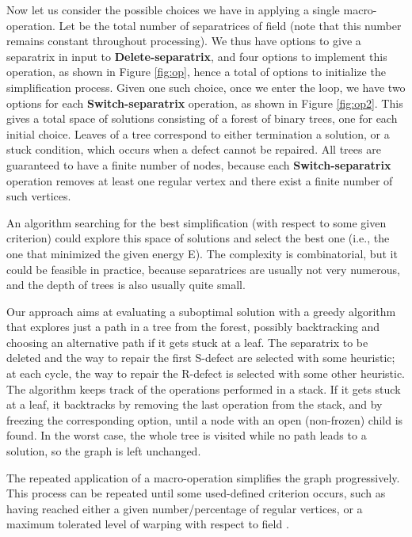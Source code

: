 \documentclass[11pt,a4paper]{article}
\begin{document}
Now let us consider the possible choices we have in applying a single macro-operation. 
Let  be the total number of separatrices of field  (note that this number remains constant throughout processing).
We thus have  options to give a separatrix in input to \textbf{Delete-separatrix}, and four options to implement this operation, as shown in Figure \ref{fig:op}, hence a total of  options to initialize the simplification process.   
Given one such choice, once we enter the loop, we have two options for each \textbf{Switch-separatrix} operation, as shown in Figure \ref{fig:op2}.
This gives a total space of solutions consisting of a forest of  binary trees, one for each initial choice.
Leaves of a tree correspond to either termination a solution, or a stuck condition, which occurs when a defect cannot be repaired.
All trees are guaranteed to have a finite number of nodes, because each \textbf{Switch-separatrix} operation removes at least one regular vertex and there exist a finite number of such vertices.

An algorithm searching for the best simplification (with respect to some given criterion) could explore this space of solutions and select the best one (i.e., the one that minimized the given energy {\cal E}).
The complexity is combinatorial, but it could be feasible in practice, because separatrices are usually not very numerous, and the depth of trees is also usually quite small.

Our approach aims at evaluating a suboptimal solution with a greedy algorithm that explores just a path in a tree from the forest, possibly backtracking and choosing an alternative path if it gets stuck at a leaf. 
The separatrix to be deleted and the way to repair the first S-defect are selected with some heuristic; at each cycle, the way to repair the R-defect is selected with some other heuristic. 
The algorithm keeps track of the operations performed in a stack. 
If it gets stuck at a leaf, it backtracks by removing the last operation from the stack, and by freezing the corresponding option, until a node with an open (non-frozen) child is found.
In the worst case, the whole tree is visited while no path leads to a solution, so the graph is left unchanged.

The repeated application of a macro-operation simplifies the graph progressively. 
This process can be repeated until some used-defined criterion occurs, such as having reached either a given number/percentage of regular vertices, or a maximum tolerated level of warping with respect to field .
\end{document}
